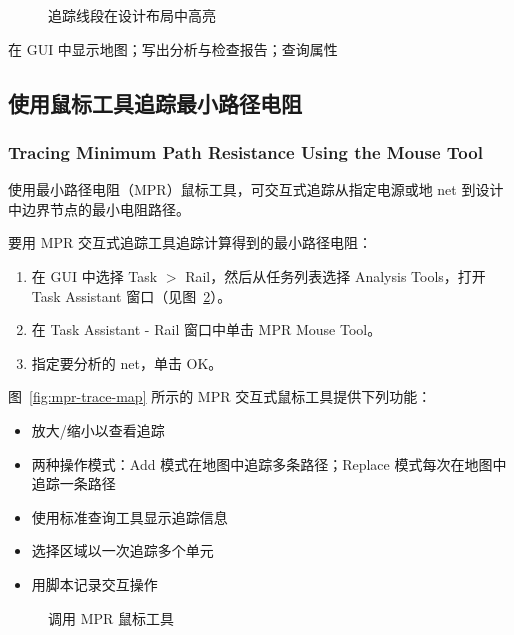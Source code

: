 \begin{figure}[htbp]
\centering
{}
\caption{追踪线段在设计布局中高亮}
\label{fig:mpr-trace}
\end{figure}

\begin{seeAlsoBox}
在 GUI 中显示地图；写出分析与检查报告；查询属性
\end{seeAlsoBox}

\subsection{使用鼠标工具追踪最小路径电阻}
\subsubsection*{Tracing Minimum Path Resistance Using the Mouse Tool}

使用最小路径电阻（MPR）鼠标工具，可交互式追踪从指定电源或地 net 到设计中边界节点的最小电阻路径。

要用 MPR 交互式追踪工具追踪计算得到的最小路径电阻：
\begin{enumerate}
  \item 在 GUI 中选择 Task $>$ Rail，然后从任务列表选择 Analysis Tools，打开 Task Assistant 窗口（见图~\ref{fig:mpr-tool}）。
  \item 在 Task Assistant - Rail 窗口中单击 MPR Mouse Tool。
  \item 指定要分析的 net，单击 OK。
\end{enumerate}

图~\ref{fig:mpr-trace-map} 所示的 MPR 交互式鼠标工具提供下列功能：
\begin{itemize}
  \item 放大/缩小以查看追踪
  \item 两种操作模式：Add 模式在地图中追踪多条路径；Replace 模式每次在地图中追踪一条路径
  \item 使用标准查询工具显示追踪信息
  \item 选择区域以一次追踪多个单元
  \item 用脚本记录交互操作
\end{itemize}

\begin{figure}[htbp]
\centering
{}
\caption{调用 MPR 鼠标工具}
\label{fig:mpr-tool}
\end{figure}

